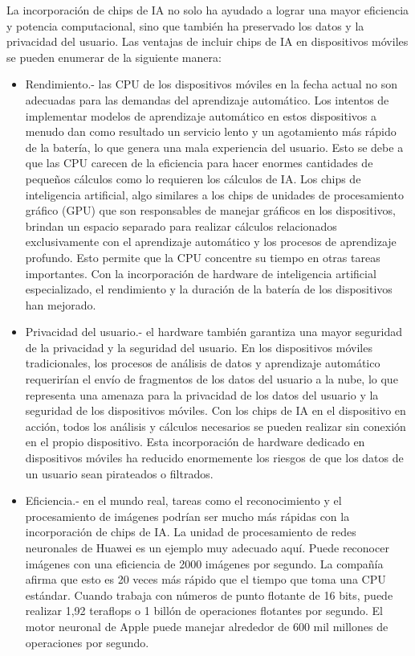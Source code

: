 La incorporación de chips de IA no solo ha ayudado a lograr una mayor eficiencia y potencia computacional, sino que también ha preservado los datos y la privacidad del usuario. Las ventajas de incluir chips de IA en dispositivos móviles se pueden enumerar de la siguiente manera:

\begin{itemize}
\item Rendimiento.- las CPU de los dispositivos móviles en la fecha actual no son adecuadas para las demandas del aprendizaje automático. Los intentos de implementar modelos de aprendizaje automático en estos dispositivos a menudo dan como resultado un servicio lento y un agotamiento más rápido de la batería, lo que genera una mala experiencia del usuario. Esto se debe a que las CPU carecen de la eficiencia para hacer enormes cantidades de pequeños cálculos como lo requieren los cálculos de IA. Los chips de inteligencia artificial, algo similares a los chips de unidades de procesamiento gráfico (GPU) que son responsables de manejar gráficos en los dispositivos, brindan un espacio separado para realizar cálculos relacionados exclusivamente con el aprendizaje automático y los procesos de aprendizaje profundo. Esto permite que la CPU concentre su tiempo en otras tareas importantes. Con la incorporación de hardware de inteligencia artificial especializado, el rendimiento y la duración de la batería de los dispositivos han mejorado.
\item Privacidad del usuario.- el hardware también garantiza una mayor seguridad de la privacidad y la seguridad del usuario. En los dispositivos móviles tradicionales, los procesos de análisis de datos y aprendizaje automático requerirían el envío de fragmentos de los datos del usuario a la nube, lo que representa una amenaza para la privacidad de los datos del usuario y la seguridad de los dispositivos móviles. Con los chips de IA en el dispositivo en acción, todos los análisis y cálculos necesarios se pueden realizar sin conexión en el propio dispositivo. Esta incorporación de hardware dedicado en dispositivos móviles ha reducido enormemente los riesgos de que los datos de un usuario sean pirateados o filtrados.
\item Eficiencia.- en el mundo real, tareas como el reconocimiento y el procesamiento de imágenes podrían ser mucho más rápidas con la incorporación de chips de IA. La unidad de procesamiento de redes neuronales de Huawei es un ejemplo muy adecuado aquí. Puede reconocer imágenes con una eficiencia de 2000 imágenes por segundo. La compañía afirma que esto es 20 veces más rápido que el tiempo que toma una CPU estándar. Cuando trabaja con números de punto flotante de 16 bits, puede realizar 1,92 teraflops o 1 billón de operaciones flotantes por segundo. El motor neuronal de Apple puede manejar alrededor de 600 mil millones de operaciones por segundo.

\end{itemize}
